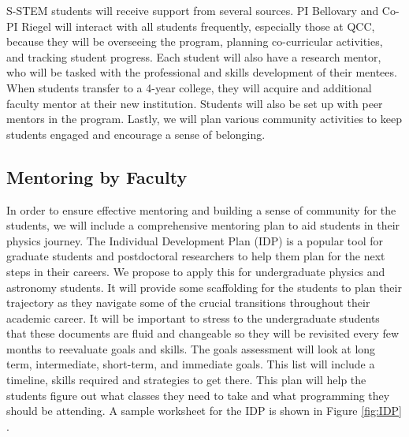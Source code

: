 \documentclass[12pt]{article}
\begin{document}

S-STEM students will receive support from several sources.  PI Bellovary and Co-PI Riegel will interact with all students frequently, especially those at QCC, because they will be overseeing the program, planning co-curricular activities, and tracking student progress.  Each student will also have a research mentor, who will be tasked with the professional and skills development of their mentees.  When students transfer to a 4-year college, they will acquire and additional faculty mentor at their new institution.  Students will also be set up with peer mentors in the program.  Lastly, we will plan various community activities to keep students engaged and encourage a sense of belonging.

\subsection{Mentoring by Faculty}

In order to ensure effective mentoring and building a sense of community for the students, we will include a comprehensive mentoring plan to aid students in their physics journey.  The Individual Development Plan (IDP) is a popular tool for graduate students and postdoctoral researchers to help them plan for the next steps in their careers. We propose to apply this for undergraduate physics and astronomy students.  It will provide some scaffolding for the students to plan their trajectory as they navigate some of the crucial transitions throughout their academic career.  It will be important to stress to the undergraduate students that these documents are fluid and changeable so they will be revisited every few months to reevaluate goals and skills.  %
The goals assessment will look at long term, intermediate, short-term, and immediate goals. This list will include a timeline, skills required and strategies to get there. 
This plan will help the students figure out what classes they need to take and what programming they should be attending. A sample worksheet for the IDP is shown in Figure \ref{fig:IDP} \citep{Bosch}.  
\end{document}
